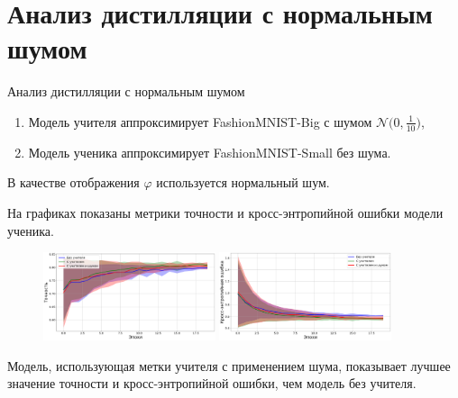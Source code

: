 \documentclass[10pt,pdf,hyperref={unicode}]{beamer}
\begin{document}
\section{Анализ дистилляции с нормальным шумом}
\begin{frame}{Анализ дистилляции с нормальным шумом}
\justifying
\begin{enumerate}[1)]
    \item Модель учителя аппроксимирует FashionMNIST-Big с шумом $\mathcal{N}\bigr(0,\frac{1}{10}\bigr)$,
    \item Модель ученика аппроксимирует FashionMNIST-Small без шума.
\end{enumerate}

\par
В качестве отображения $\varphi$ используется нормальный шум.

На графиках показаны метрики точности и кросс-энтропийной ошибки модели ученика.

\begin{figure}[h!]
\includegraphics[width=0.45\textwidth]{results/noise_acc.png}
\includegraphics[width=0.45\textwidth]{results/noise_loss.png}
\end{figure}

Модель, использующая метки учителя с применением шума, показывает лучшее значение точности и кросс-энтропийной ошибки, чем модель без учителя.

\end{frame}

\end{document}
